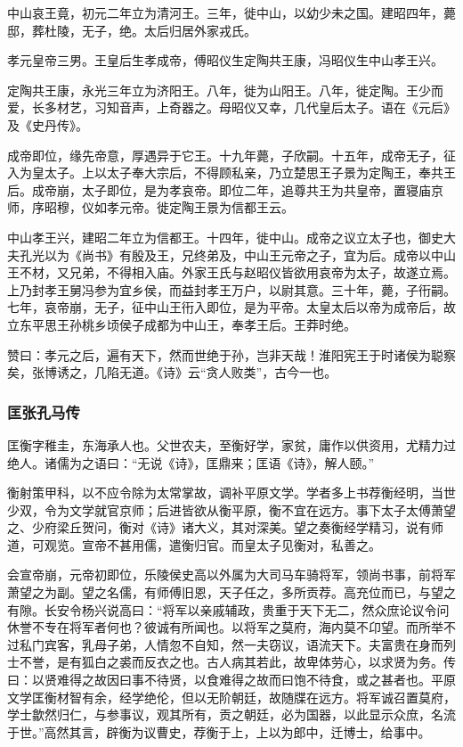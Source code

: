 \documentclass[]{article}
\begin{document}
中山哀王竟，初元二年立为清河王。三年，徙中山，以幼少未之国。建昭四年，薨邸，葬杜陵，无子，绝。太后归居外家戎氏。

孝元皇帝三男。王皇后生孝成帝，傅昭仪生定陶共王康，冯昭仪生中山孝王兴。

定陶共王康，永光三年立为济阳王。八年，徙为山阳王。八年，徙定陶。王少而爱，长多材艺，习知音声，上奇器之。母昭仪又幸，几代皇后太子。语在《元后》及《史丹传》。

成帝即位，缘先帝意，厚遇异于它王。十九年薨，子欣嗣。十五年，成帝无子，征入为皇太子。上以太子奉大宗后，不得顾私亲，乃立楚思王子景为定陶王，奉共王后。成帝崩，太子即位，是为孝哀帝。即位二年，追尊共王为共皇帝，置寝庙京师，序昭穆，仪如孝元帝。徙定陶王景为信都王云。

中山孝王兴，建昭二年立为信都王。十四年，徙中山。成帝之议立太子也，御史大夫孔光以为《尚书》有殷及王，兄终弟及，中山王元帝之子，宜为后。成帝以中山王不材，又兄弟，不得相入庙。外家王氏与赵昭仪皆欲用哀帝为太子，故遂立焉。上乃封孝王舅冯参为宜乡侯，而益封孝王万户，以尉其意。三十年，薨，子衎嗣。七年，哀帝崩，无子，征中山王衎入即位，是为平帝。太皇太后以帝为成帝后，故立东平思王孙桃乡顷侯子成都为中山王，奉孝王后。王莽时绝。

赞曰：孝元之后，遍有天下，然而世绝于孙，岂非天哉！淮阳宪王于时诸侯为聪察矣，张博诱之，几陷无道。《诗》云``贪人败类''，古今一也。

\hypertarget{header-n5594}{%
\subsubsection{匡张孔马传}\label{header-n5594}}

匡衡字稚圭，东海承人也。父世农夫，至衡好学，家贫，庸作以供资用，尤精力过绝人。诸儒为之语曰：``无说《诗》，匡鼎来；匡语《诗》，解人颐。''

衡射策甲科，以不应令除为太常掌故，调补平原文学。学者多上书荐衡经明，当世少双，令为文学就官京师；后进皆欲从衡平原，衡不宜在远方。事下太子太傅萧望之、少府梁丘贺问，衡对《诗》诸大义，其对深美。望之奏衡经学精习，说有师道，可观览。宣帝不甚用儒，遣衡归官。而皇太子见衡对，私善之。

会宣帝崩，元帝初即位，乐陵侯史高以外属为大司马车骑将军，领尚书事，前将军萧望之为副。望之名儒，有师傅旧恩，天子任之，多所贡荐。高充位而已，与望之有隙。长安令杨兴说高曰：``将军以亲戚辅政，贵重于天下无二，然众庶论议令问休誉不专在将军者何也？彼诚有所闻也。以将军之莫府，海内莫不卬望。而所举不过私门宾客，乳母子弟，人情忽不自知，然一夫窃议，语流天下。夫富贵在身而列士不誉，是有狐白之裘而反衣之也。古人病其若此，故卑体劳心，以求贤为务。传曰：以贤难得之故因曰事不待贤，以食难得之故而曰饱不待食，或之甚者也。平原文学匡衡材智有余，经学绝伦，但以无阶朝廷，故随牒在远方。将军诚召置莫府，学士歙然归仁，与参事议，观其所有，贡之朝廷，必为国器，以此显示众庶，名流于世。''高然其言，辟衡为议曹史，荐衡于上，上以为郎中，迁博士，给事中。
\end{document}
